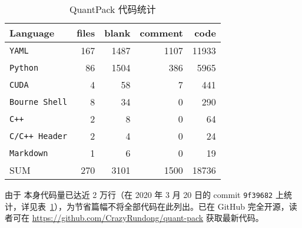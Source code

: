 \begin{table}[htb]
  \centering
  \caption{QuantPack 代码统计}
  \label{tab::aappendix::cloc}
  \begin{tabular}{l *{4}{r}}
    \toprule
    Language &                   files &        blank &      comment &         code \\
    \midrule
    \texttt{YAML} &                         167 &         1487 &         1107 &        11933 \\
    \texttt{Python} &                        86 &         1504 &          386 &         5965 \\
    \texttt{CUDA} &                           4 &           58 &            7 &          441 \\
    \texttt{Bourne Shell} &                   8 &           34 &            0 &          290 \\
    \texttt{C++} &                            2 &            8 &            0 &           64 \\
    \texttt{C/C++ Header} &                   2 &            4 &            0 &           24 \\
    \texttt{Markdown} &                       1 &            6 &            0 &           19 \\
    \hdashline
    SUM &                          270 &         3101 &         1500 &        18736 \\
    \bottomrule
  \end{tabular}
\end{table}

由于 \QP 本身代码量已达近 2 万行（在 2020 年 3 月 20 日的 commit \verb|9f39682| 上统计，详见表~\ref{tab::aappendix::cloc}），为节省篇幅不将全部代码在此列出。\QP 已在 GitHub 完全开源，读者可在 \url{https://github.com/CrazyRundong/quant-pack} 获取最新代码。
